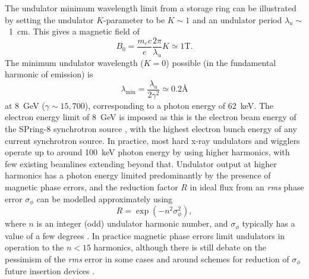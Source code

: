 \documentclass[../main.tex]{subfiles}
\begin{document}
The undulator minimum wavelength limit from a storage ring can be illustrated by setting the undulator $K$-parameter to be $K\sim 1$ and an undulator period $\lambda_u\sim$~1~\si{\centi\meter}. This gives a magnetic field of
\begin{equation}
B_{0} = \frac{m_{e} c}{e}\frac{2\pi}{\lambda_{u}} K \simeq 1\textrm{T}.
\label{eq:undulator_field_limit}
\end{equation}
The minimum undulator wavelength ($K=0$) possible (in the fundamental harmonic of emission) is
\begin{equation}
\lambda_\textrm{min} = \frac{\lambda_{u}}{2 \gamma^2} \simeq 0.2 \textrm{\AA}
\label{eq:undulator_minimum_wavelength}
\end{equation}
at 8~\si{\giga\electronvolt} ($\gamma \sim 15,700$), corresponding to a photon energy of $62$~\si{\kilo\electronvolt}. The electron energy limit of 8~\si{\giga\electronvolt} is imposed as this is the electron beam energy of the SPring-8 synchrotron source \cite{spring8beamlines}, with the highest electron bunch energy of any current synchrotron source. In practice, most hard x-ray undulators and wigglers operate up to around 100~\si{\kilo\electronvolt} photon energy by using higher harmonics, with few existing beamlines extending beyond that. Undulator output at higher harmonics has a photon energy limited predominantly by the presence of magnetic phase errors, and the reduction factor $R$ in ideal flux from an \textit{rms} phase error $\sigma_{\phi}$ can be modelled approximately \cite{walker1993interference} using 
\begin{equation}
R=\exp{\left(-n^2 \sigma_{\phi}^{2}\right)},
\label{eq:undulator_phase_errors}
\end{equation}
where $n$ is an integer (odd) undulator harmonic number, and $\sigma_\phi$ typically has a value of a few degrees \cite{walker2013phase}. In practice magnetic phase errors limit undulators in operation to the $n<15$ harmonics, although there is still debate on the pessimism of the \textit{rms} error in some cases \cite{tanaka2018universal} and around schemes for reduction of $\sigma_{\phi}$ future insertion devices \cite{hwang2011development,huang2017challenges}.
\end{document}

